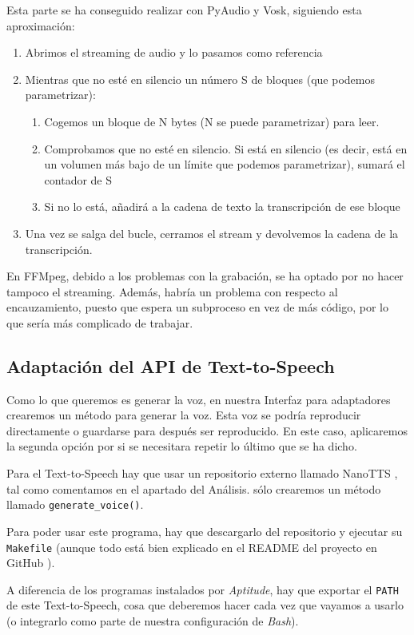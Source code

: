 Esta parte se ha conseguido realizar con PyAudio y Vosk, siguiendo esta aproximación:

\begin{enumerate}
	\item Abrimos el streaming de audio y lo pasamos como referencia
	\item Mientras que no esté en silencio un número S de bloques (que podemos parametrizar):
	\begin{enumerate}
		\item Cogemos un bloque de N bytes (N se puede parametrizar) para leer.
		\item Comprobamos que no esté en silencio. Si está en silencio (es decir, está en un volumen más bajo de un límite que podemos parametrizar), sumará el contador de S
		\item Si no lo está, añadirá a la cadena de texto la transcripción de ese bloque
	\end{enumerate}
	\item Una vez se salga del bucle, cerramos el stream y devolvemos la cadena de la transcripción.
\end{enumerate}

En FFMpeg, debido a los problemas con la grabación, se ha optado por no hacer tampoco el streaming. Además, habría un problema con respecto al encauzamiento, puesto que espera un subproceso en vez de más código, por lo que sería más complicado de trabajar.

\subsection{Adaptación del API de Text-to-Speech}
Como lo que queremos es generar la voz, en nuestra Interfaz para adaptadores crearemos un método para generar la voz. Esta voz se podría reproducir directamente o guardarse para después ser reproducido. En este caso, aplicaremos la segunda opción por si se necesitara repetir lo último que se ha dicho.

Para el Text-to-Speech hay que usar un repositorio externo llamado NanoTTS \cite{nanotts}, tal como comentamos en el apartado del Análisis. sólo crearemos un método llamado \texttt{generate\_voice()}.

Para poder usar este programa, hay que descargarlo del repositorio y ejecutar su \texttt{Makefile} (aunque todo está bien explicado en el README del proyecto en GitHub \cite{nanotts}).

A diferencia de los programas instalados por \textit{Aptitude}, hay que exportar el \texttt{PATH} de este Text-to-Speech, cosa que deberemos hacer cada vez que vayamos a usarlo (o integrarlo como parte de nuestra configuración de \textit{Bash}).

